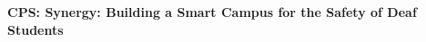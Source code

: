 \documentclass[10pt]{article}
\renewcommand{\(}{\begin{eqnarray*}}
\renewcommand{\)}{\end{eqnarray*}}
\begin{document}
\setcounter{page}{1}
\def\mysection{A}
\nsffoot {}

\begin{center}
\vspace{-6mm}
{\bf CPS: Synergy: Building a Smart Campus for the Safety of Deaf Students}
\end{center}
\vspace*{-2mm}

\vspace{-6pt}
\vspace*{.1in}
\pagebreak


\setcounter{page}{1}
\def\mysection{C}
\nsffoot {}
\def\thesection{\arabic{section}}
\def\thesubsection{\arabic{section}.\arabic{subsection}}
\def\thesubsubsection{\arabic{section}.\arabic{subsection}.\arabic{subsubsection}}


%
%

%

\newpage
\setcounter{page}{1}
\def\mysection{E}
%
%
\end{document}
